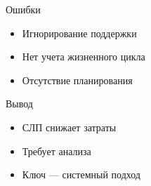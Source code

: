 \documentclass{beamer}
\begin{document}

\begin{frame}{Ошибки}
\begin{itemize}
    \item Игнорирование поддержки
    \item Нет учета жизненного цикла
    \item Отсутствие планирования
\end{itemize}

\end{frame}


\begin{frame}{Вывод}
\begin{itemize}
    \item СЛП снижает затраты
    \item Требует анализа
    \item Ключ — системный подход
\end{itemize}

\end{frame}
\end{document}
